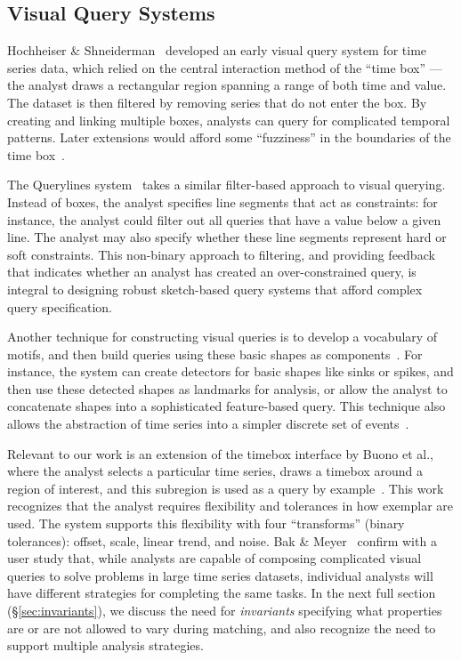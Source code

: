 \subsection{Visual Query Systems}

Hochheiser \& Shneiderman~\cite{hochheiser2004dynamic} developed an early visual query system for time series data, which relied on the central interaction method of the ``time box'' --- the analyst draws a rectangular region spanning a range of both time and value. The dataset is then filtered by removing series that do not enter the box. By creating and linking multiple boxes, analysts can query for complicated temporal patterns. Later extensions would afford some ``fuzziness'' in the boundaries of the time box~\cite{keogh2002augmented}.

The Querylines system~\cite{ryall2005querylines} takes a similar filter-based approach to visual querying. Instead of boxes, the analyst specifies line segments that act as constraints: for instance, the analyst could filter out all queries that have a value below a given line. The analyst may also specify whether these line segments represent hard or soft constraints. This non-binary approach to filtering, and providing feedback that indicates whether an analyst has created an over-constrained query, is integral to designing robust sketch-based query systems that afford complex query specification.

Another technique for constructing visual queries is to develop a vocabulary of motifs, and then build queries using these basic shapes as components~\cite{gregory2012shape}. For instance, the system can create detectors for basic shapes like sinks or spikes, and then use these detected shapes as landmarks for analysis, or allow the analyst to concatenate shapes into a sophisticated feature-based query. This technique also allows the abstraction of time series into a simpler discrete set of events~\cite{lan2013temporal}.

Relevant to our work is an extension of the timebox interface by Buono et al., where the analyst selects a particular time series, draws a timebox around a region of interest, and this subregion is used as a query by example~\cite{buono2005interactive}. This work recognizes that the analyst requires flexibility and tolerances in how exemplar are used. The system supports this flexibility with four ``transforms'' (binary tolerances): offset, scale, linear trend, and noise. Bak \& Meyer~\cite{bak2011effect} confirm with a user study that, while analysts are capable of composing complicated visual queries to solve problems in large time series datasets, individual analysts will have different strategies for completing the same tasks. In the next full section (\S\ref{sec:invariants}), we discuss the need for \emph{invariants} specifying what properties are or are not allowed to vary during matching, and also recognize the need to support multiple analysis strategies.

